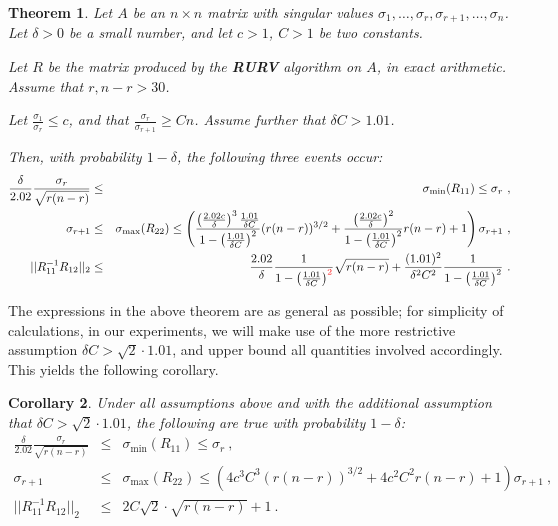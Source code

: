 \documentclass{article}
\newcommand{\red}[1]{\textcolor{red}{#1}}
\newtheorem{theorem}{Theorem}[section]
\newtheorem{corollary}[theorem]{Corollary}
\theoremstyle{definition}
\begin{document}
\begin{theorem} \label{thm_rurv}  Let $A$ be an $n \times n$ matrix
  with singular values $\sigma_1, \ldots, \sigma_r, \sigma_{r+1},
  \ldots, \sigma_n$. Let $\delta>0$ be a small number, and let $c>1$, $C >1$ be two constants. 

Let $R$ be the matrix produced by the \textbf{RURV} algorithm on $A$, \emph{in
    exact arithmetic}.  Assume that $r, n-r > 30$. 

Let $\frac{\sigma_1}{\sigma_r} \leq c$, and that $\frac{\sigma_{r}}{\sigma_{r+1}} \geq C n$. Assume further that $\delta C > 1.01$. 

Then, with probability $1-\delta$, the following three events occur:
\begin{eqnarray}
\label{unu} \frac{\delta}{2.02} \frac{\sigma_{r}}{\sqrt{r (n-r)}} & \leq & \sigma_{\min}(R_{11}) \leq \sigma_r ~,\\ 
\label{doi} \sigma_{r+1} & \leq & \sigma_{\max} (R_{22}) \leq \left ( \frac{\left ( \frac{2.02 c}{\delta} \right)^3 \frac{1.01}{\delta C}}{1- \left ( \frac{1.01}{\delta C} \right)^2} (r(n-r))^{3/2} +  \frac{\left ( \frac{2.02 c}{\delta} \right)^2}{1 -\left ( \frac{1.01}{\delta C} \right)^2} r(n-r) + 1 \right ) \sigma_{r+1}~,\\
\label{trei} ||R_{11}^{-1} R_{12}||_2 & \leq & \frac{2.02}{\delta} \frac{1}{1-\left ( \frac{1.01}{\delta C} \right)^{\red{2}}} \sqrt{r (n-r)} + \frac{(1.01)^2}{\delta^2 C^2} \frac{1}{1 - \left ( \frac{1.01}{\delta C} \right)^2} ~.
\end{eqnarray}
\end{theorem}

The expressions in the above theorem are as general as possible; for simplicity of calculations, in our experiments, we will make use of the more restrictive assumption $\delta C>\sqrt{2} \cdot 1.01$, and upper bound all quantities involved accordingly. This yields the following corollary.

\begin{corollary}
Under all assumptions above and with the additional assumption that $\delta C>\sqrt{2} \cdot 1.01$, the following are true with probability $1-\delta$:
\begin{eqnarray}
\label{unu} \frac{\delta}{2.02} \frac{\sigma_{r}}{\sqrt{r (n-r)}} & \leq & \sigma_{\min}(R_{11}) \leq \sigma_r ~,\\ 
\label{doi} \sigma_{r+1} & \leq & \sigma_{\max} (R_{22}) \leq \left (4c^3C^3 (r(n-r))^{3/2} +  4c^2C^2 r(n-r) + 1 \right ) \sigma_{r+1}~,\\
\label{trei} ||R_{11}^{-1} R_{12}||_2 & \leq & 2C\sqrt{2}\cdot \sqrt{r (n-r)} + 1 ~.
\end{eqnarray}
\end{corollary}
\end{document}
